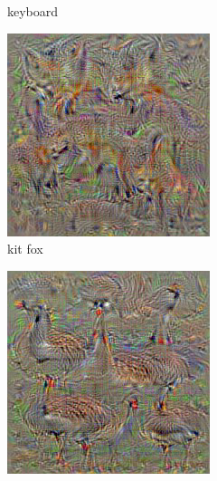 \begin{figure}[htbp]
\begin{subfigure}[b]{0.3\textwidth}
    \caption{keyboard}
    \label{fig:sec:context:deep-visualization-class-4}
  \end{subfigure}
  \hfill
  \begin{subfigure}[b]{0.3\textwidth}
    \includegraphics[width=\textwidth]{gfx/deep-visualization-class-5}
    \caption{kit fox}
    \label{fig:sec:context:deep-visualization-class-5}
  \end{subfigure}
  \hfill
  \begin{subfigure}[b]{0.3\textwidth}
    \includegraphics[width=\textwidth]{gfx/deep-visualization-class-6}

\end{subfigure}
\end{figure}
